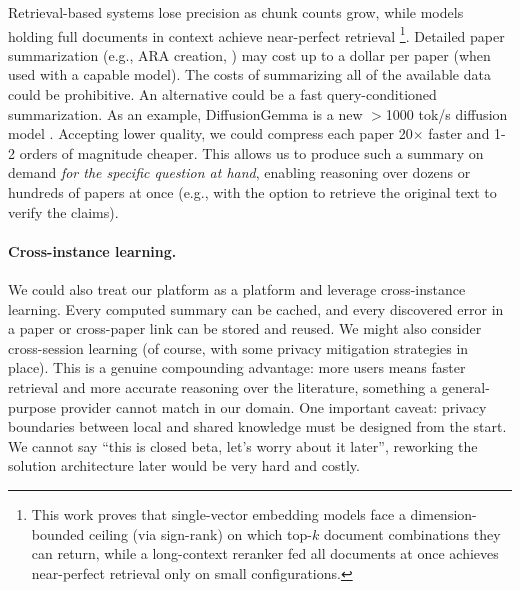 Retrieval-based systems lose precision as chunk counts grow, while models holding full documents in context achieve near-perfect retrieval \cite{2508.21038}\footnote{
    This work proves that single-vector embedding models face a dimension-bounded ceiling (via sign-rank) on which top-$k$ document combinations they can return, while a long-context reranker fed all documents at once achieves near-perfect retrieval only on small configurations.
    }.
Detailed paper summarization (e.g., ARA creation, \cite{2604.24658}) may cost up to a dollar per paper (when used with a capable model). The costs of summarizing all of the available data could be prohibitive. 
An alternative could be a fast query-conditioned summarization. As an example, DiffusionGemma is a new $>$1000 tok/s diffusion model \cite {google2026diffusiongemma}. Accepting lower quality, we could compress each paper 20$\times$ faster and 1-2 orders of magnitude cheaper. This allows us to produce such a summary on demand \emph{for the specific question at hand}, enabling reasoning over dozens or hundreds of papers at once (e.g., with the option to retrieve the original text to verify the claims).

\paragraph{Cross-instance learning.}
We could also treat our platform as a platform and leverage cross-instance learning. Every computed summary can be cached, and every discovered error in a paper or cross-paper link can be stored and reused. We might also consider cross-session learning (of course, with some privacy mitigation strategies in place). This is a genuine compounding advantage: more users means faster retrieval and more accurate reasoning over the literature, something a general-purpose provider cannot match in our domain. One important caveat: privacy boundaries between local and shared knowledge must be designed from the start. We cannot say ``this is closed beta, let's worry about it later'', reworking the solution architecture later would be very hard and costly.

